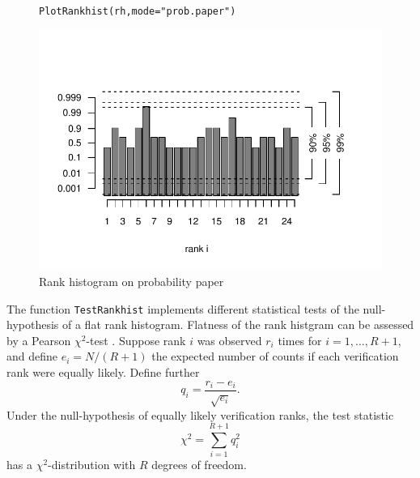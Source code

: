 \documentclass[10pt]{article}\usepackage[]{graphicx}\usepackage[]{color}
\makeatletter
\def\maxwidth{ %
  \ifdim\Gin@nat@width>\linewidth
    \linewidth
  \else
    \Gin@nat@width
  \fi
}
\newcommand{\hlstr}[1]{\textcolor[rgb]{0.651,0.522,0}{#1}}%
\newcommand{\hlstd}[1]{\textcolor[rgb]{0,0,0}{#1}}%
\newcommand{\hlkwc}[1]{\textcolor[rgb]{0,0.502,0.753}{#1}}%
\newcommand{\hlkwd}[1]{\textcolor[rgb]{0,0.267,0.4}{#1}}%
\newenvironment{kframe}{%
 \def\at@end@of@kframe{}%
 \ifinner\ifhmode%
  \def\at@end@of@kframe{\end{minipage}}%
  \begin{minipage}{\columnwidth}%
 \fi\fi%
 \def\FrameCommand##1{\hskip\@totalleftmargin \hskip-\fboxsep
 \colorbox{shadecolor}{##1}\hskip-\fboxsep
     \hskip-\linewidth \hskip-\@totalleftmargin \hskip\columnwidth}%
 \MakeFramed {\advance\hsize-\width
   \@totalleftmargin\z@ \linewidth\hsize
   \@setminipage}}%
 {\par\unskip\endMakeFramed%
 \at@end@of@kframe}
\newenvironment{knitrout}{}{} %
\newcommand{\code}[1]{\texttt{#1}}
\makeatother
\begin{document}
\begin{figure}
\begin{center}
%
\begin{knitrout}
\color{fgcolor}\begin{kframe}
\begin{alltt}
\hlkwd{PlotRankhist}\hlstd{(rh,} \hlkwc{mode}\hlstd{=}\hlstr{"prob.paper"}\hlstd{)}
\end{alltt}
\end{kframe}
\includegraphics[width=\maxwidth]{figure/rank-hist-pp-1} 

\end{knitrout}
%
\end{center}
\caption{Rank histogram on probability paper}
\label{fig:rank-hist-pp}
\end{figure}


The function \code{TestRankhist} implements different statistical tests of the null-hypothesis of a flat rank histogram.
Flatness of the rank histgram can be assessed by a Pearson $\chi^2$-test \citep{pearson1900criterion}.
Suppose rank $i$ was observed $r_i$ times for $i=1,\dots,R+1$, and define $e_i=N/(R+1)$ the expected number of counts if each verification rank were equally likely.
Define further
\begin{equation}
q_i = \frac{r_i - e_i}{\sqrt{e_i}}.
\end{equation}
%
Under the null-hypothesis of equally likely verification ranks, the test statistic
%
\begin{equation}
\chi^2 = \sum_{i=1}^{R+1} q_i^2
\end{equation}
%
has a $\chi^2$-distribution with $R$ degrees of freedom.
\end{document}
